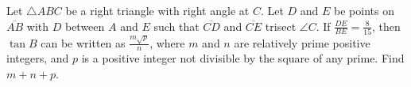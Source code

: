 Let $\triangle ABC$ be a right triangle with right angle at $C$. Let $D$ and $E$ be points on $\overline{AB}$ with $D$ between $A$ and $E$ such that $\overline{CD}$ and $\overline{CE}$ trisect $\angle C$.  If $\frac{DE}{BE} = \frac{8}{15}$, then $\tan B$ can be written as $\frac{m\sqrt{p}}{n}$, where $m$ and $n$ are relatively prime positive integers, and $p$ is a positive integer not divisible by the square of any prime.  Find $m+n+p$.